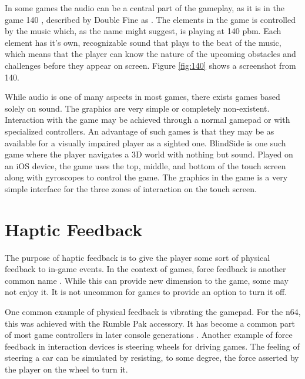 In some games the audio can be a central part of the gameplay, as it is in the game 140 \cite{140game}, described by Double Fine as
.
The elements in the game is controlled by the music which, as the name might suggest, is playing at 140 pbm.
Each element has it's own, recognizable sound that plays to the beat of the music, which means that the player can know the nature of the upcoming obstacles and challenges before they appear on screen.
Figure \ref{fig:140} shows a screenshot from 140.

While audio is one of many aspects in most games, there exists games based solely on sound.
The graphics are very simple or completely non-existent.
Interaction with the game may be achieved through a normal gamepad or with specialized controllers.
An advantage of such games is that they may be as available for a visually impaired player as a sighted one.
BlindSide \cite{blindside} is one such game where the player navigates a 3D world with nothing but sound.
Played on an iOS device, the game uses the top, middle, and bottom of the touch screen along with gyroscopes to control the game.
The graphics in the game is a very simple interface for the three zones of interaction on the touch screen.

\section{Haptic Feedback}
\label{immersionHaptic}
The purpose of haptic feedback is to give the player some sort of physical feedback to in-game events.
In the context of games, force feedback is another common name \cite{cummings2007evolution}.
While this can provide new dimension to the game, some may not enjoy it.
It is not uncommon for games to provide an option to turn it off.

One common example of physical feedback is vibrating the gamepad.
For the \gls{n64}, this was achieved with the Rumble Pak accessory.
It has become a common part of most game controllers in later console generations \cite{cummings2007evolution}.
Another example of force feedback in interaction devices is steering wheels for driving games.
The feeling of steering a car can be simulated by resisting, to some degree, the force asserted by the player on the wheel to turn it.


